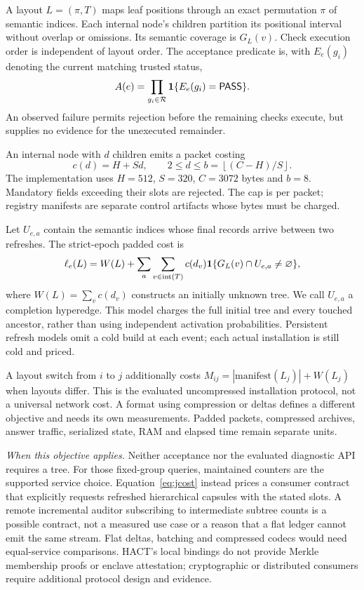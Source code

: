 \documentclass[10pt,journal,compsoc]{IEEEtran}
\theoremstyle{definition}\newtheorem{definition}[theorem]{Definition}
\newcommand{\PASS}{\mathsf{PASS}}\newcommand{\FAIL}{\mathsf{FAIL}}\newcommand{\UNKNOWN}{\mathsf{UNKNOWN}}
\begin{document}
A layout $L=(\pi,T)$ maps leaf positions through an exact permutation $\pi$
of semantic indices. Each internal node's children partition its positional
interval without overlap or omissions. Its semantic coverage is $G_L(v)$.
Check execution order is independent of layout order. The acceptance
predicate is, with $E_e(g_i)$ denoting the current matching trusted status,
\begin{equation}\label{eq:accept}
 A(e)=\prod_{g_i\in\mathcal R}\ind\{E_e(g_i)=\PASS\}.
\end{equation}
An observed failure permits rejection before the remaining checks execute,
but supplies no evidence for the unexecuted remainder.

An internal node with $d$ children emits a packet costing
\begin{equation}\label{eq:packet}
 c(d)=H+Sd,\qquad 2\le d\le
 b=\left\lfloor(C-H)/S\right\rfloor.
\end{equation}
The implementation uses $H=512$, $S=320$, $C=3072$ bytes and $b=8$.
Mandatory fields exceeding their slots are rejected. The cap is per packet;
registry manifests are separate control artifacts whose bytes must be charged.

Let $U_{e,a}$ contain the semantic indices whose final records arrive
between two refreshes. The strict-epoch padded cost is
\begin{equation}\label{eq:jcost}
 \ell_e(L)=W(L)+\sum_a\sum_{v\in\operatorname{int}(T)}
 c(d_v)\mathbf 1\{G_L(v)\cap U_{e,a}\ne\varnothing\},
\end{equation}
where $W(L)=\sum_vc(d_v)$ constructs an initially unknown tree.
We call $U_{e,a}$ a completion hyperedge. This model charges the full initial
tree and every touched ancestor, rather than using independent activation
probabilities. Persistent refresh models omit a cold build at each event;
each actual installation is still cold and priced.

A layout switch from $i$ to $j$ additionally costs
$M_{ij}=|\mathrm{manifest}(L_j)|+W(L_j)$ when layouts differ.
This is the evaluated uncompressed installation protocol, not a universal
network cost. A format using compression or deltas defines a different
objective and needs its own measurements. Padded packets, compressed
archives, answer traffic, serialized state, RAM and elapsed time remain
separate units.

\medskip\noindent\textit{When this objective applies.}
Neither acceptance nor the evaluated diagnostic API requires a tree.
For those fixed-group queries, maintained counters are the supported service
choice. Equation~\eqref{eq:jcost} instead prices a consumer contract that
explicitly requests refreshed hierarchical capsules with the stated slots.
A remote incremental auditor subscribing to intermediate subtree counts is
a possible contract, not a measured use case or a reason that a flat ledger
cannot emit the same stream. Flat deltas, batching and compressed codecs
would need equal-service comparisons. HACT's local bindings do not provide
Merkle membership proofs or enclave attestation; cryptographic or distributed
consumers require additional protocol design and evidence.
\end{document}
